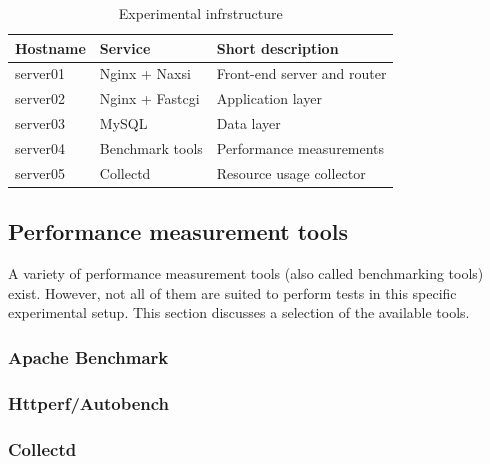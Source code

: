 \documentclass[Methods]{subfiles}
\begin{document}
\begin{table}[H]
\caption{Experimental infrstructure}
\begin{tabular}{|p{}|p{}|p{5cm}|}
\hline
\textbf{Hostname} & \textbf{Service} & \textbf{Short description} \\ \hline
server01 & Nginx + Naxsi & Front-end server and router \\ \hline
server02 & Nginx + Fastcgi & Application layer \\ \hline
server03 & MySQL & Data layer \\ \hline
server04 & Benchmark tools & Performance measurements \\ \hline
server05 & Collectd & Resource usage collector \\ \hline
\end{tabular}
\label{tab:Experimental infrastructure}
\end{table}

\subsection{Performance measurement tools}
A variety of performance measurement tools (also called benchmarking tools) exist. However, not all of them are suited to perform tests in this specific experimental setup. This section discusses a selection of the available tools.

\subsubsection{Apache Benchmark}


\subsubsection{Httperf/Autobench}


\subsubsection{Collectd}

\end{document}
